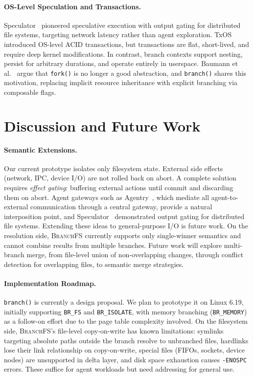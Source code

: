 \documentclass[sigconf]{acmart}
\newcommand{\sys}{\textsc{BranchFS}\xspace}
\newcommand{\syscall}{\texttt{branch()}\xspace}
\begin{document}
\paragraph{OS-Level Speculation and Transactions.}
Speculator~\cite{speculator} pioneered speculative execution with output gating for distributed file systems, targeting network latency rather than agent exploration. TxOS~\cite{txos} introduced OS-level ACID transactions, but transactions are flat, short-lived, and require deep kernel modifications. In contrast, branch contexts support nesting, persist for arbitrary durations, and operate entirely in userspace. Baumann et al.~\cite{fork-hotos} argue that \texttt{fork()} is no longer a good abstraction, and \syscall shares this motivation, replacing implicit resource inheritance with explicit branching via composable flags.

\section{Discussion and Future Work}

\paragraph{Semantic Extensions.}
Our current prototype isolates only filesystem state. External side effects (network, IPC, device I/O) are not rolled back on abort. A complete solution requires \emph{effect gating}: buffering external actions until commit and discarding them on abort. Agent gateways such as Agentry~\cite{agentry}, which mediate all agent-to-external communication through a central gateway, provide a natural interposition point, and Speculator~\cite{speculator} demonstrated output gating for distributed file systems. Extending these ideas to general-purpose I/O is future work. On the resolution side, \sys currently supports only single-winner semantics and cannot combine results from multiple branches. Future work will explore multi-branch merge, from file-level union of non-overlapping changes, through conflict detection for overlapping files, to semantic merge strategies.

\paragraph{Implementation Roadmap.}
\syscall is currently a design proposal. We plan to prototype it on Linux 6.19, initially supporting \texttt{BR\_FS} and \texttt{BR\_ISOLATE}, with memory branching (\texttt{BR\_MEMORY}) as a follow-on effort due to the page table complexity involved. On the filesystem side, \sys's file-level copy-on-write has known limitations: symlinks targeting absolute paths outside the branch resolve to unbranched files, hardlinks lose their link relationship on copy-on-write, special files (FIFOs, sockets, device nodes) are unsupported in delta layer, and disk space exhaustion causes \texttt{-ENOSPC} errors. These suffice for agent workloads but need addressing for general use.
\end{document}
